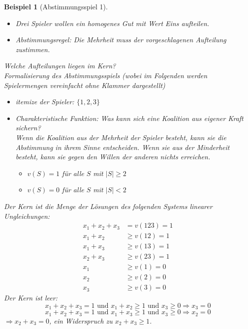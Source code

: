 \documentclass[12pt]{extreport} %
\theoremstyle{named}
\theoremstyle{itshape}
\theoremstyle{normal}
\newtheorem{beispiel}[unnamedtheorem]{Beispiel}
\begin{document}
\begin{beispiel}[Abstimmungsspiel 1] ~\
	\begin{itemize}
		\item Drei Spieler wollen ein homogenes Gut mit Wert Eins aufteilen. 
		\item Abstimmungsregel: Die Mehrheit muss der vorgeschlagenen Aufteilung zustimmen.
	\end{itemize}
	Welche Aufteilungen liegen im Kern? ~\\
	
	Formalisierung des Abstimmungsspiels (wobei im Folgenden werden Spielermengen vereinfacht ohne Klammer dargestellt)
	\begin{itemize}
		\item  itemize der Spieler: $\{1, 2, 3\}$
		\item Charakteristische Funktion: Was kann sich eine Koalition aus eigener Kraft sichern? ~\\
			Wenn die Koalition aus der Mehrheit der Spieler besteht, kann sie die Abstimmung in ihrem Sinne entscheiden. Wenn sie aus der Minderheit besteht, kann sie gegen den Willen der anderen nichts erreichen.
				\begin{itemize}
					\item $v(S) = 1$ für alle $S$ mit $|S| \geq 2$
					\item $v(S) = 0$ für alle $S$ mit $|S| < 2$
				\end{itemize}
	\end{itemize}
	Der Kern ist die Menge der Lösungen des folgenden Systems linearer Ungleichungen:
	\begin{align*}
		x_1 + x_2 + x_3 & = v(123) = 1 \\
		x_1 + x_2 & \geq v(12) = 1 \\
		x_1 + x_3 & \geq v(13) = 1 \\
		x_2 + x_3 & \geq v(23) = 1 \\
		x_1 & \geq v(1) = 0 \\
		x_2 & \geq v(2) = 0 \\
		x_3 & \geq v(3) = 0 		
	\end{align*}
	Der Kern ist leer:
	$$ x_1 + x_2 + x_3 = 1 \text{ und } x_1 + x_2 \geq 1 \text{ und } x_3 \geq 0 \Rightarrow x_3 = 0 $$
	$$ x_1 + x_2 + x_3 = 1 \text{ und } x_1 + x_3 \geq 1 \text{ und } x_3 \geq 0 \Rightarrow x_2 = 0 $$
	$\Rightarrow x_2 + x_3 = 0$, ein Widerspruch zu $x_2 + x_3 \geq 1$.
\end{beispiel}
 
\end{document}
